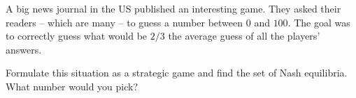 \documentclass[../../main.tex]{subfiles}
\begin{document}
    \begin{myexe}
        A big news journal in the US published an interesting game. They asked their readers -- which are many -- to guess a number between $0$ and $100$. The goal was to correctly guess what would be $2/3$ the average guess of all the players' answers.

        Formulate this situation as a strategic game and find the set of Nash equilibria. What number would you pick?
    \end{myexe}
\end{document}
